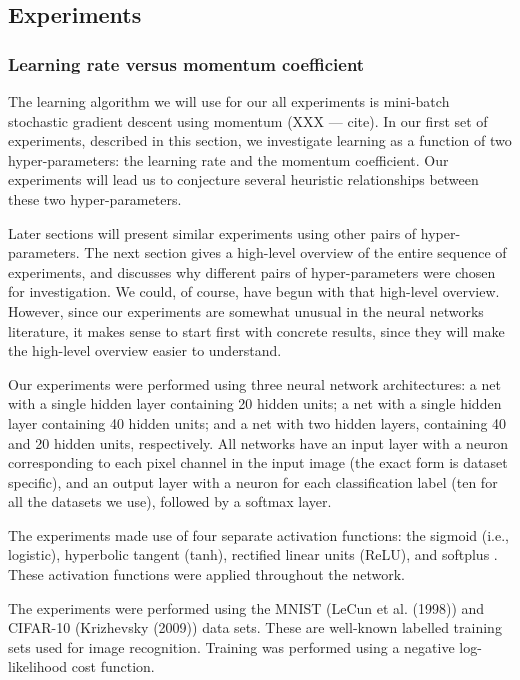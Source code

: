 \documentclass[10pt]{article}
\begin{document}
\subsection*{Experiments}

\subsubsection*{Learning rate versus momentum coefficient}

The learning algorithm we will use for our all experiments is
mini-batch stochastic gradient descent using momentum (XXX --- cite).
In our first set of experiments, described in this section, we
investigate learning as a function of two hyper-parameters: the
learning rate and the momentum coefficient.  Our experiments will lead
us to conjecture several heuristic relationships between these two
hyper-parameters.

Later sections will present similar experiments using other pairs of
hyper-parameters.  The next section gives a high-level overview of the
entire sequence of experiments, and discusses why different pairs of
hyper-parameters were chosen for investigation.  We could, of course,
have begun with that high-level overview.  However, since our
experiments are somewhat unusual in the neural networks literature, it
makes sense to start first with concrete results, since they will make
the high-level overview easier to understand.

Our experiments were performed using three neural network
architectures: a net with a single hidden layer containing 20 hidden
units; a net with a single hidden layer containing 40 hidden units;
and a net with two hidden layers, containing 40 and 20 hidden units,
respectively. All networks have an input layer with a neuron
corresponding to each pixel channel in the input image (the exact form
is dataset specific), and an output layer with a neuron for each
classification label (ten for all the datasets we use), followed by a
softmax layer.

The experiments made use of four separate activation functions: the
sigmoid (i.e., logistic), hyperbolic tangent (tanh), rectified linear
units (ReLU), and softplus \cite{Glorot2010a,Dugas2001a}.  These
activation functions were applied throughout the network.

The experiments were performed using the MNIST (LeCun et al. (1998))
and CIFAR-10 (Krizhevsky (2009)) data sets.  These are well-known
labelled training sets used for image recognition.  Training was
performed using a negative log-likelihood cost function.
\end{document}
